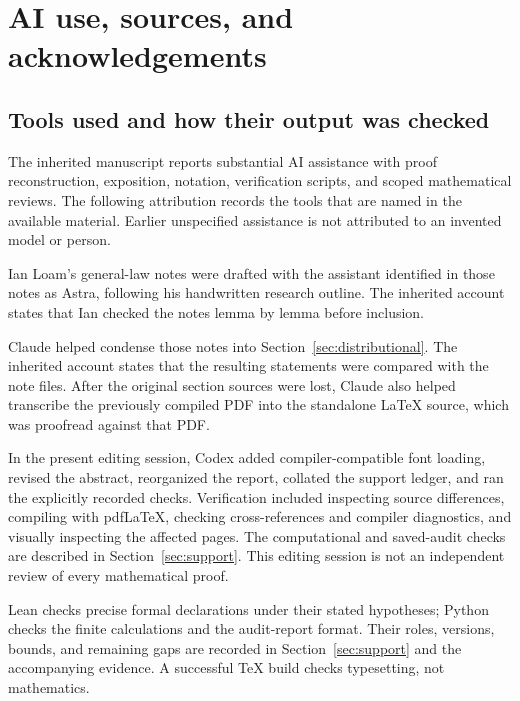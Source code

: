 \documentclass[11pt]{article}
\theoremstyle{definition}\newtheorem{definition}[theorem]{Definition}
\theoremstyle{remark}\newtheorem{remark}[theorem]{Remark}
\begin{document}
\section{AI use, sources, and acknowledgements}\label{sec:ai}\label{sec:conclusion}

\subsection{Tools used and how their output was checked}
The inherited manuscript reports substantial AI assistance with proof reconstruction, exposition, notation, verification scripts, and scoped mathematical reviews. The following attribution records the tools that are named in the available material. Earlier unspecified assistance is not attributed to an invented model or person.

\begin{description}[style=nextline]
\item[Astra.] Ian Loam's general-law notes were drafted with the assistant identified in those notes as Astra, following his handwritten research outline. The inherited account states that Ian checked the notes lemma by lemma before inclusion.
\item[Claude (Anthropic).] Claude helped condense those notes into Section~\ref{sec:distributional}. The inherited account states that the resulting statements were compared with the note files. After the original section sources were lost, Claude also helped transcribe the previously compiled PDF into the standalone LaTeX source, which was proofread against that PDF.
\item[OpenAI Codex.] In the present editing session, Codex added compiler-compatible font loading, revised the abstract, reorganized the report, collated the support ledger, and ran the explicitly recorded checks. Verification included inspecting source differences, compiling with pdfLaTeX, checking cross-references and compiler diagnostics, and visually inspecting the affected pages. The computational and saved-audit checks are described in Section~\ref{sec:support}. This editing session is not an independent review of every mathematical proof.
\item[Lean and Python.] Lean checks precise formal declarations under their stated hypotheses; Python checks the finite calculations and the audit-report format. Their roles, versions, bounds, and remaining gaps are recorded in Section~\ref{sec:support} and the accompanying evidence. A successful TeX build checks typesetting, not mathematics.
\end{description}
\end{document}
